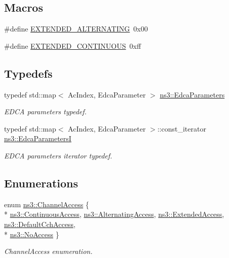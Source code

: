 \subsection*{Macros}
\begin{DoxyCompactItemize}
\item 
\#define \hyperlink{channel-scheduler_8h_a0e1f74c3cb8f78904dd1ae957412392e}{E\+X\+T\+E\+N\+D\+E\+D\+\_\+\+A\+L\+T\+E\+R\+N\+A\+T\+I\+NG}~0x00
\item 
\#define \hyperlink{channel-scheduler_8h_a51fe3e802b9451e2893d55d591047fc1}{E\+X\+T\+E\+N\+D\+E\+D\+\_\+\+C\+O\+N\+T\+I\+N\+U\+O\+US}~0xff
\end{DoxyCompactItemize}
\subsection*{Typedefs}
\begin{DoxyCompactItemize}
\item 
typedef std\+::map$<$ Ac\+Index, Edca\+Parameter $>$ \hyperlink{namespacens3_a4f9cc7033fc74229d642a5add53ad8e2}{ns3\+::\+Edca\+Parameters}
\begin{DoxyCompactList}\small\item\em E\+D\+CA parameters typedef. \end{DoxyCompactList}\item 
typedef std\+::map$<$ Ac\+Index, Edca\+Parameter $>$\+::const\+\_\+iterator \hyperlink{namespacens3_a0d8197f125c2e22b88fcd163ae1f30b1}{ns3\+::\+Edca\+ParametersI}
\begin{DoxyCompactList}\small\item\em E\+D\+CA parameters iterator typedef. \end{DoxyCompactList}\end{DoxyCompactItemize}
\subsection*{Enumerations}
\begin{DoxyCompactItemize}
\item 
enum \hyperlink{namespacens3_a877f2f8d3767cc34993bce0739179781}{ns3\+::\+Channel\+Access} \{ \\*
\hyperlink{namespacens3_a877f2f8d3767cc34993bce0739179781a9fa99c55ecd8d6db5f44d7b788076973}{ns3\+::\+Continuous\+Access}, 
\hyperlink{namespacens3_a877f2f8d3767cc34993bce0739179781a5b36d54e91da429a2e16406e0eacb3a2}{ns3\+::\+Alternating\+Access}, 
\hyperlink{namespacens3_a877f2f8d3767cc34993bce0739179781ac1c8b8ed6a7f5ebb2170e06593521da5}{ns3\+::\+Extended\+Access}, 
\hyperlink{namespacens3_a877f2f8d3767cc34993bce0739179781af80a046b555961b3327692b8e86a0d9e}{ns3\+::\+Default\+Cch\+Access}, 
\\*
\hyperlink{namespacens3_a877f2f8d3767cc34993bce0739179781a1d48a345d572c1ef6d4be0a0b1c21704}{ns3\+::\+No\+Access}
 \}\begin{DoxyCompactList}\small\item\em Channel\+Access enumeration. \end{DoxyCompactList}
\end{DoxyCompactItemize}


